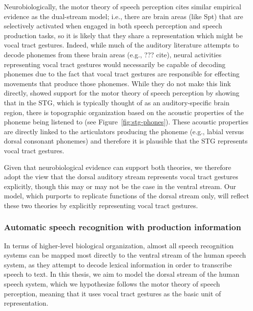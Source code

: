 {Neurobiologically,
the motor theory of speech perception
cites similar empirical evidence as
the dual-stream model;
i.e., there are brain areas (like Spt)
that are selectively activated
when engaged in both speech perception
and speech production tasks,
so it is likely that they share
a representation which might be vocal tract gestures.
Indeed, while much of the auditory literature
attempts to decode phonemes
from these brain areas
(e.g., ??? cite),
neural activities representing vocal tract gestures
would necessarily be capable of
decoding phonemes due to the fact that
vocal tract gestures are responsible
for effecting movements that produce
those phonemes.
While they do not make this link directly,
\citet{mesgarani2014}
showed support for the motor theory of speech perception
by showing that in the STG,
which is typically thought of
as an auditory-specific brain region,
there is topographic organization
based on the acoustic properties
of the phoneme being listened to
(see Figure~\ref{fig:stg-phones}).
These acoustic properties are
directly linked to the articulators
producing the phoneme
(e.g., labial versus dorsal consonant phonemes)
and therefore it is plausible that
the STG represents vocal tract gestures.


Given that neurobiological evidence can
support both theories,
we therefore adopt the view that
the dorsal auditory stream
represents vocal tract gestures explicitly,
though this may or may not be the case
in the ventral stream.
Our model, which purports to replicate
functions of the dorsal stream only,
will reflect these two theories
by explicitly representing vocal tract gestures.

\subsubsection{Automatic speech recognition with production information}
\label{sec:asr-prod}

In terms of higher-level biological organization,
almost all speech recognition systems
can be mapped most directly
to the ventral stream of the human speech system,
as they attempt to decode
lexical information in order to
transcribe speech to text.
In this thesis, we aim to model
the dorsal stream of the human speech system,
which we hypothesize follows the
motor theory of speech perception,
meaning that it uses vocal tract gestures
as the basic unit of representation.

}
